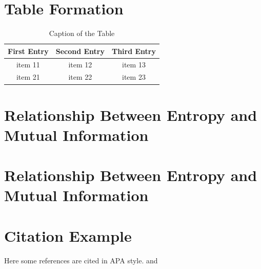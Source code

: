 \section{Table Formation}
\begin{table}[hbt!]
    \centering
    \caption{Caption of the Table}
    \begin{tabular}{ccc}
    \hline
    First Entry & Second Entry & Third Entry\\ 
    \hline
 item 11 & item 12 & item 13 \\
 item 21  & item 22  & item 23  \\
\hline
    \end{tabular}
    \label{tab 1.1}
\end{table}
\section{Relationship Between Entropy and Mutual
Information}
\hspace{4em}


\section{Relationship Between Entropy and Mutual
Information}
\hspace{4em}


\section{Citation Example}
\hspace{4em}
Here some references are cited in APA style. \cite{vellacheri2014high} and \cite{asaithambi2021synthesis}